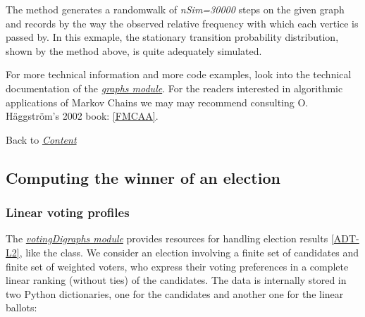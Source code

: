 \documentclass[letterpaper,10pt,english]{sphinxmanual}
\begin{document}
The  method generates a randomwalk of \emph{nSim=30000} steps on the given graph and records by the way the observed relative frequency with which each vertice is passed by. In this exmaple, the stationary transition probability distribution, shown by the  method above, is quite adequately simulated.

For more technical information and more code examples, look into the technical documentation of the {\hyperref[techDoc:graphs-label]{\emph{graphs module}}}. For the readers interested in algorithmic applications of Markov Chains we may may recommend consulting O. Häggström's 2002 book: {\hyperref[tutorial:fmcaa]{{[}FMCAA{]}}}.

Back to {\hyperref[tutorial:tutorial-label]{\emph{Content}}}


\subsection{Computing the winner of an election}
\label{tutorial:computing-the-winner-of-an-election}\label{tutorial:linearvoting-label}

\subsubsection{Linear voting profiles}
\label{tutorial:linear-voting-profiles}
The {\hyperref[techDoc:votingdigraphs-label]{\emph{votingDigraphs module}}} provides resources for handling election results {\hyperref[tutorial:adt-l2]{{[}ADT-L2{]}}}, like the  class. We consider an election involving a finite set of candidates and finite set of weighted voters, who express their voting preferences in a complete linear ranking (without ties) of the candidates. The data is internally stored in two Python dictionaries, one for the candidates and another one for the linear ballots:
\end{document}
